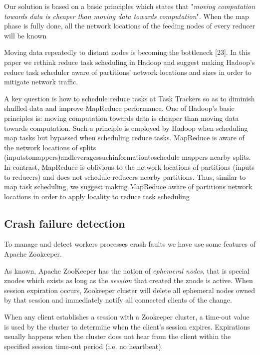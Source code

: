 \documentclass[sigchi]{acmart}
\begin{document}
Our solution is based on a basic principles which states that "\textit{moving computation towards data is cheaper than moving data towards computation}". When the map phase is fully done, all the network locations of the feeding nodes of every reducer will be known


Moving data repeatedly to distant nodes is becoming the bottleneck [23]. In this paper we rethink reduce task scheduling in Hadoop and suggest making Hadoop’s reduce task scheduler aware of partitions’ network locations and sizes in order to mitigate network traffic. 

A key question is how to schedule reduce tasks at Task Trackers so as to diminish shuffled data and improve MapReduce performance. One of Hadoop’s basic principles is: moving computation towards data is cheaper than moving data towards computation. Such a principle is employed by Hadoop when scheduling map tasks but bypassed when scheduling reduce tasks. MapReduce is aware of the network locations of splits (inputstomappers)andleveragessuchinformationtoschedule mappers nearby splits. In contrast, MapReduce is oblivious to the network locations of partitions (inputs to reducers) and does not schedule reducers nearby partitions. Thus, similar to map task scheduling, we suggest making MapReduce aware of partitions network locations in order to apply locality to reduce task scheduling








\subsection{Crash failure detection} To manage and detect workers processes crash faults we have use some features of Apache Zookeeper. 

As known, Apache ZooKeeper has the notion of \textit{ephemeral nodes}, that is special znodes which exists as long as the \textit{session} that created the znode is active. When session expiration occurs, Zookeeper cluster will delete all ephemeral nodes owned by that session and immediately notify all connected clients of the change.

When any client establishes a session with a Zookeeper cluster, a time-out value is used by the cluster to determine when the client's session expires. Expirations usually happens when the cluster does not hear from the client within the specified session time-out period (i.e. no heartbeat).
\end{document}
